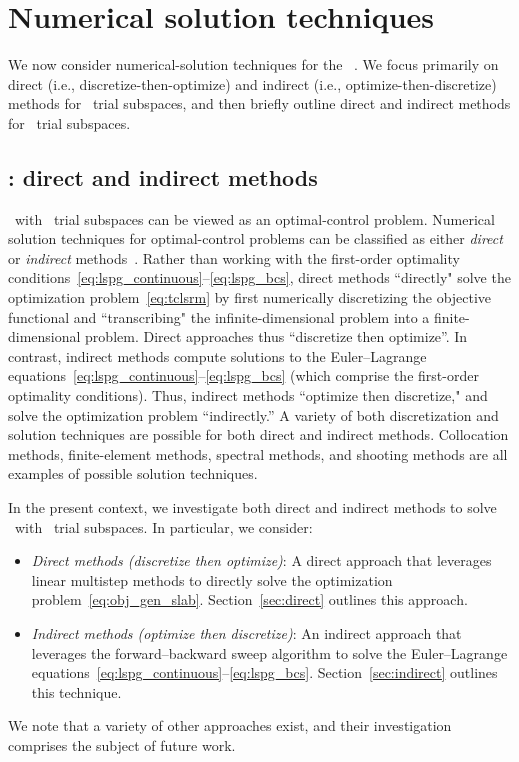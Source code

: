 \section{Numerical solution techniques}\label{sec:numerical_techniques}
We now consider numerical-solution techniques for the \methodAcronym\ \approachKwd.
We focus primarily on 
direct (i.e., discretize-then-optimize) and indirect (i.e., optimize-then-discretize) methods for \spatialAcronym\ trial subspaces, 
and then briefly outline direct and indirect methods for \spaceTimeAcronym\ trial subspaces. 
\subsection{\spatialAcronym: direct and indirect methods}
\methodAcronym\ with \spatialAcronym\ trial subspaces can be viewed as an optimal-control problem.
Numerical solution techniques for
optimal-control problems can be classified as either
\textit{direct} or \textit{indirect}
methods~\cite{conway_optimalcontrolreview}. Rather than working with the first-order optimality conditions~\eqref{eq:lspg_continuous}--\eqref{eq:lspg_bcs}, direct methods ``directly" solve the optimization problem~\eqref{eq:tclsrm} by first
numerically discretizing the objective functional and ``transcribing"
the infinite-dimensional problem into a finite-dimensional 
problem. Direct approaches thus
``discretize then optimize''. 
In contrast, indirect methods compute solutions to the Euler--Lagrange
equations~\eqref{eq:lspg_continuous}--\eqref{eq:lspg_bcs} (which comprise the
first-order optimality conditions). Thus, indirect methods
``optimize then discretize," and solve the optimization problem
``indirectly.'' A variety of both discretization and solution techniques are possible
for both direct and indirect methods. Collocation methods,
finite-element methods, spectral methods, and shooting methods are all examples of
possible solution techniques.  

In the present context, we investigate both direct and indirect methods to solve \methodAcronym\ with \spatialAcronym\ trial
subspaces. In particular, we consider:
\begin{itemize} \item \textit{Direct methods (discretize then optimize)}: A
			direct approach that leverages linear multistep methods to directly solve the optimization problem~\eqref{eq:obj_gen_slab}.
Section~\ref{sec:direct} outlines this approach.
\item \textit{Indirect methods (optimize then discretize)}: An indirect
	approach that leverages the forward--backward sweep algorithm to solve the
		Euler--Lagrange equations~\eqref{eq:lspg_continuous}--\eqref{eq:lspg_bcs}.
Section~\ref{sec:indirect} outlines this technique.
\end{itemize} 
We note that a variety of other approaches exist, and their investigation
comprises the subject of future work.




